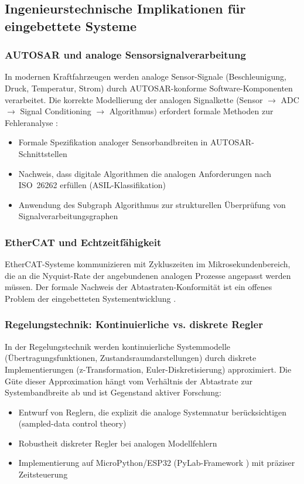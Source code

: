 ﻿\documentclass[a4paper,12pt]{article}
\theoremstyle{definition}
\begin{document}
\subsection{Ingenieurstechnische Implikationen für eingebettete Systeme}

\subsubsection{AUTOSAR und analoge Sensorsignalverarbeitung}

In modernen Kraftfahrzeugen werden analoge Sensor-Signale (Beschleunigung,
Druck, Temperatur, Strom) durch AUTOSAR-konforme Software-Komponenten
verarbeitet.  Die korrekte Modellierung der analogen Signalkette
(Sensor $\to$ ADC $\to$ Signal Conditioning $\to$ Algorithmus) erfordert
formale Methoden zur Fehleranalyse \citep{Autosar2023}:
\begin{itemize}
    \item Formale Spezifikation analoger Sensorbandbreiten in AUTOSAR-Schnittstellen
    \item Nachweis, dass digitale Algorithmen die analogen Anforderungen nach
          ISO~26262 erfüllen (ASIL-Klassifikation)
    \item Anwendung des Subgraph Algorithmus \citep{Epp2026embedded} zur
          strukturellen Überprüfung von Signalverarbeitungsgraphen
\end{itemize}

\subsubsection{EtherCAT und Echtzeitfähigkeit}

EtherCAT-Systeme kommunizieren mit Zykluszeiten im Mikrosekundenbereich,
die an die Nyquist-Rate der angebundenen analogen Prozesse angepasst werden müssen.
Der formale Nachweis der Abtastraten-Konformität ist ein offenes Problem der
eingebetteten Systementwicklung \citep{Epp2026ehae}.

\subsubsection{Regelungstechnik: Kontinuierliche vs. diskrete Regler}

In der Regelungstechnik werden kontinuierliche Systemmodelle
(Übertragungsfunktionen, Zustandsraumdarstellungen) durch diskrete
Implementierungen (z-Transformation, Euler-Diskretisierung) approximiert.
Die Güte dieser Approximation hängt vom Verhältnis der Abtastrate zur
Systembandbreite ab und ist Gegenstand aktiver Forschung:
\begin{itemize}
    \item Entwurf von Reglern, die explizit die analoge Systemnatur berücksichtigen
          (sampled-data control theory)
    \item Robustheit diskreter Regler bei analogen Modellfehlern
    \item Implementierung auf MicroPython/ESP32 (PyLab-Framework \citep{Epp2026pylab})
          mit präziser Zeitsteuerung
\end{itemize}
\end{document}
